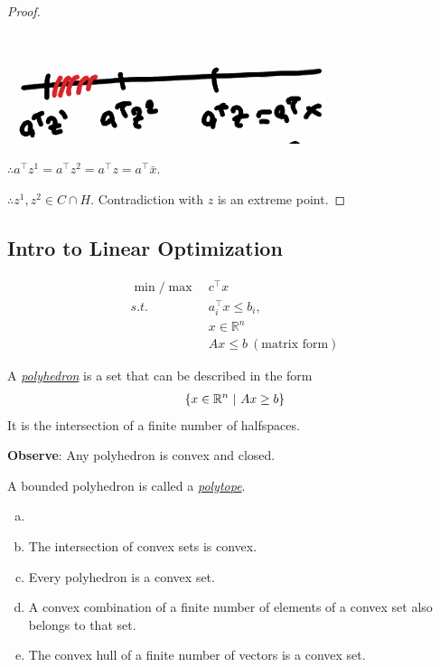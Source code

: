 \documentclass[11pt]{article}
\numberwithin{equation}{section}
\begin{document}
\begin{theorem}
\begin{proof}
        \begin{center}
            \includegraphics[scale = 0.5]{images/4-pr-2.png}
        \end{center}

        $\therefore a^{\top} z^{1}=a^{\top} z^{2}=a^{\top} z=a^{\top} \bar{x}$.
    
        $\therefore z^{1}, z^{2} \in C \cap H$. Contradiction with $z$ is an extreme point.
    \end{proof}
\end{theorem}

\subsection{Intro to Linear Optimization}
\begin{align*}
    \min / \max \  & c^\top x\\
    s.t. \  & a_i^\top  x \leq b_i,\\
    & x \in \mathbb{R}^n\\
    & Ax \leq b \ \left( \text{matrix form} \right)
\end{align*}
\begin{definition}
    A \underline{\textit{polyhedron}} is a set that can be described in the form \begin{align*}
        \left\{ x \in \mathbb R^n\ |\ Ax \geq b \right\}
    \end{align*}
    It is the intersection of a finite number of halfspaces.
\end{definition}
\textbf{Observe}: Any polyhedron is convex and closed.
\begin{definition}
    A bounded polyhedron is called a \underline{\textit{polytope}}.
\end{definition}

\begin{theorem}
    \begin{enumerate}[(a)]
        \item[]
        \item The intersection of convex sets is convex.
        \item Every polyhedron is a convex set.
        \item A convex combination of a finite number of elements of a convex set also belongs to that set.
        \item The convex hull of a finite number of vectors is a convex set.
    \end{enumerate}
\end{theorem}
\end{document}
